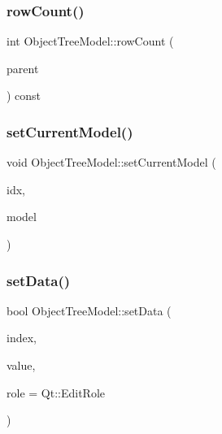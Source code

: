 \mbox{\label{class_object_tree_model_af8a2f187fa81897db0983e4a47d2e315}} 
\subsubsection{\texorpdfstring{rowCount()}{rowCount()}}
{\footnotesize\ttfamily int Object\+Tree\+Model\+::row\+Count (\begin{DoxyParamCaption}\item[{const Q\+Model\+Index \&}]{parent }\end{DoxyParamCaption}) const}

\mbox{\label{class_object_tree_model_a6bb051a5a800338ad8091b6fdcc207fa}} 
\subsubsection{\texorpdfstring{setCurrentModel()}{setCurrentModel()}}
{\footnotesize\ttfamily void Object\+Tree\+Model\+::set\+Current\+Model (\begin{DoxyParamCaption}\item[{int}]{idx,  }\item[{\mbox{\hyperlink{class_displace_model}{Displace\+Model}} $\ast$}]{model }\end{DoxyParamCaption})}

\mbox{\label{class_object_tree_model_a6c80b29fee10e7cb84c30975411ec524}} 
\subsubsection{\texorpdfstring{setData()}{setData()}}
{\footnotesize\ttfamily bool Object\+Tree\+Model\+::set\+Data (\begin{DoxyParamCaption}\item[{const Q\+Model\+Index \&}]{index,  }\item[{const Q\+Variant \&}]{value,  }\item[{int}]{role = {\ttfamily Qt\+:\+:EditRole} }\end{DoxyParamCaption})}



